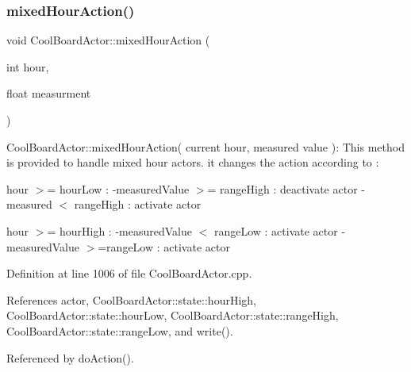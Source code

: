 \subsubsection{\texorpdfstring{mixed\+Hour\+Action()}{mixedHourAction()}}
{\footnotesize\ttfamily void Cool\+Board\+Actor\+::mixed\+Hour\+Action (\begin{DoxyParamCaption}\item[{int}]{hour,  }\item[{float}]{measurment }\end{DoxyParamCaption})}

Cool\+Board\+Actor\+::mixed\+Hour\+Action( current hour, measured value )\+: This method is provided to handle mixed hour actors. it changes the action according to \+:

hour $>$= hour\+Low \+: -\/measured\+Value $>$= range\+High \+: deactivate actor -\/measured $<$ range\+High \+: activate actor

hour $>$= hour\+High \+: -\/measured\+Value $<$ range\+Low \+: activate actor -\/measured\+Value $>$=range\+Low \+: activate actor 

Definition at line 1006 of file Cool\+Board\+Actor.\+cpp.



References actor, Cool\+Board\+Actor\+::state\+::hour\+High, Cool\+Board\+Actor\+::state\+::hour\+Low, Cool\+Board\+Actor\+::state\+::range\+High, Cool\+Board\+Actor\+::state\+::range\+Low, and write().



Referenced by do\+Action().

